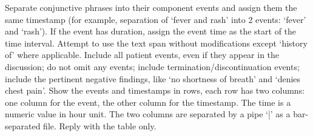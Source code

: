 \begin{tcolorbox}
Separate conjunctive phrases into their component events and assign them the same timestamp (for example, separation of ‘fever and rash’ into 2 events: ‘fever’ and ‘rash’). If the event has duration, assign the event time as the start of the time interval. Attempt to use the text span without modifications except ‘history of’ where applicable. Include all patient events, even if they appear in the discussion; do not omit any events; include termination/discontinuation events; include the pertinent negative findings, like ‘no shortness of breath’ and ‘denies chest pain’. Show the events and timestamps in rows, each row has two columns: one column for the event, the other column for the timestamp. The time is a numeric value in hour unit. The two columns are separated by a pipe ‘|’ as a bar-separated file. Reply with the table only.
\end{tcolorbox}
